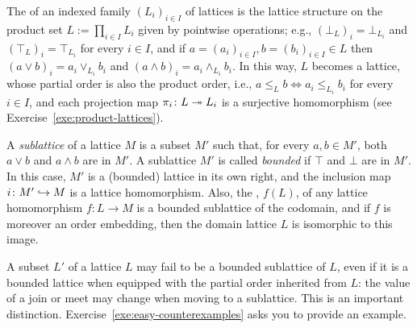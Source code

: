 The  of an indexed family $(L_i)_{i \in I}$ of lattices is the lattice structure on the product set $L := \prod_{i \in I} L_i$ given by pointwise operations; e.g., $(\bot_L)_i = \bot_{L_i}$ and $(\top_L)_i = \top_{L_i}$ for every $i \in I$, and if $a = (a_i)_{i \in I}, b = (b_i)_{i \in I} \in L$ then $(a \vee b)_i = a_i \vee_{L_i} b_i$ and $(a \wedge b)_i = a_i \wedge_{L_i} b_i$. In this way, $L$ becomes a lattice, whose partial order is also the product order, i.e., $a \leq_L b \iff a_i \leq_{L_i} b_i$ for every $i \in I$, and each projection map $\pi_i \colon L \twoheadrightarrow L_i$ is a surjective homomorphism (see Exercise~\ref{exe:product-lattices}).

A \emph{sublattice} of a lattice $M$ is a subset $M'$ such that, for every $a, b \in M'$, both $a \vee b$ and $a \wedge b$ are in $M'$. A sublattice $M'$ is called \emph{bounded} if $\top$ and $\bot$ are in $M'$. In this case, $M'$ is a (bounded) lattice in its own right, and the inclusion map $i \colon M' \hookrightarrow M$ is a lattice homomorphism. Also, the , $f(L)$, of any lattice homomorphism $f \colon L \to M$ is a bounded sublattice of the codomain, and if $f$ is moreover an order embedding, then the domain lattice $L$ is isomorphic to this image. %

A subset $L'$ of a lattice $L$ may fail to be a bounded sublattice of $L$, even if it is a bounded lattice when equipped with the partial order inherited from $L$: the value of a join or meet may change when moving to a sublattice. This is an important distinction. Exercise~\ref{exe:easy-counterexamples} asks you to provide an example.

